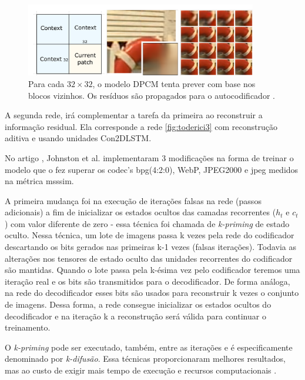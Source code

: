 \begin{figure}
	\centering
	\includegraphics[width=0.90\textwidth]{figuras/toderici_7.pdf}
	\caption[]{Para cada  $32 \times 32$, o modelo DPCM tenta prever com base nos blocos vizinhos. Os resíduos são propagados para o autocodificador \cite{SpatiallyAdaptive2018Minnen}.}
	\label{fig:toderici7}
\end{figure}

A segunda rede, irá complementar a tarefa da primeira ao reconstruir a informação residual. Ela corresponde a rede \ref{fig:toderici3} com reconstrução aditiva e usando unidades Con2DLSTM. 



No artigo \cite{Priming2017Johnston}, Johnston et al. implementaram 3 modificações na forma de treinar o modelo que o fez superar os \acrshort{codec}'s \acrshort{bpg}(4:2:0), WebP, JPEG2000 e \acrshort{jpeg} medidos na métrica \acrshort{msssim}. 

A primeira mudança foi na execução de iterações falsas na rede (passos adicionais) a fim de inicializar os estados ocultos das camadas recorrentes ($h_t$ e $c_t$) com valor diferente de zero - essa técnica foi chamada de \textit{k-priming} de estado oculto.
Nessa técnica, um lote de imagens passa k vezes pela rede do codificador descartando os bits gerados nas primeiras k-1 vezes (falsas iterações). Todavia as alterações nos tensores de estado oculto das unidades recorrentes do codificador são mantidas. Quando o lote passa pela k-ésima vez pelo codificador teremos uma iteração real e os bits são transmitidos para o decodificador. 
De forma análoga, na rede do decodificador esses bits são usados para reconstruir k vezes o conjunto de imagens. Dessa forma, a rede consegue inicializar os estados ocultos do decodificador e na iteração k a reconstrução será válida para continuar o treinamento.    

O \textit{k-priming} pode ser executado, também, entre as iterações e é especificamente denominado por \textit{k-difusão}. Essa técnicas proporcionaram melhores resultados, mas ao custo de exigir mais tempo de execução e recursos computacionais \cite{Priming2017Johnston}. 

